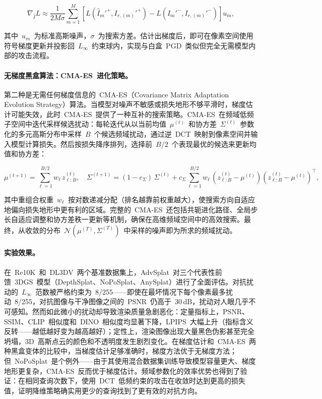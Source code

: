 \begin{equation}
    \nabla_{\hat{I}} L \approx \frac{1}{2M\sigma} \sum_{m=1}^{M} \left[L(\hat{I}_m'^{+}, I_{r,(m)}'^{+}) - L(\hat{I}_m'^{-}, I_{r,(m)}'^{-})\right] u_m,
\end{equation}

其中~$u_m$~为标准高斯噪声，$\sigma$~为搜索方差。估计出梯度后，即可在像素空间使用符号梯度更新并投影回~$L_\infty$~约束球内，实现与白盒~PGD~类似但完全无需模型内部的攻击流程。

\paragraph{无梯度黑盒算法：CMA-ES~进化策略。}
第二种是无需任何梯度信息的~CMA-ES（Covariance Matrix Adaptation Evolution Strategy）算法。当模型对噪声不敏感或损失地形不够平滑时，梯度估计可能失效，此时~CMA-ES~提供了一种互补的搜索策略。CMA-ES~在频域低频子空间中迭代采样候选扰动：每轮迭代从以当前均值~$\mu^{(t)}$~和协方差~$\Sigma^{(t)}$~参数化的多元高斯分布中采样~$B$~个候选频域扰动，通过逆~DCT~映射到像素空间并输入模型计算损失。然后按损失降序排列，选择前~$B/2$~个表现最优的候选来更新均值和协方差：

\begin{equation}
    \mu^{(t+1)} = \sum_{\ell=1}^{B/2} w_\ell \, z_{\ell:B}^{(t)}, \quad
    \Sigma^{(t+1)} = (1-c_\Sigma)\,\Sigma^{(t)} + c_\Sigma \sum_{\ell=1}^{B/2} w_\ell \, (z_{\ell:B}^{(t)} - \mu^{(t)})(z_{\ell:B}^{(t)} - \mu^{(t)})^\top,
\end{equation}

其中重组合权重~$w_\ell$~按对数递减分配（排名越靠前权重越大），使搜索方向自适应地偏向损失地形中更有利的区域。完整的~CMA-ES~还包括共轭进化路径、全局步长自适应调整和协方差秩一更新等机制，确保在高维频域空间中的高效搜索。最终，从收敛的分布~$\mathcal{N}(\mu^{(T)}, \Sigma^{(T)})$~中采样的噪声即为所求的频域扰动。

\paragraph{实验效果。}
在~Re10K~和~DL3DV~两个基准数据集上，AdvSplat~对三个代表性前馈~3DGS~模型（DepthSplat、NoPoSplat、AnySplat）进行了全面评估。对抗扰动的~$L_\infty$~范数被严格约束为~8/255——即使在最坏情况下每个像素最多扰动~8/255，对抗图像与干净图像之间的~PSNR~仍高于~30\,dB，扰动对人眼几乎不可感知。然而如此微小的扰动却导致渲染质量急剧恶化：定量指标上，PSNR、SSIM、CLIP~相似度和~DINO~相似度均显著下降，LPIPS~大幅上升（指标含义反转——越低越好变为越高越好）；定性上，渲染图像出现大量黑色伪影甚至完全坍塌，3D~高斯点云的颜色和不透明度发生剧烈变化。在梯度估计和~CMA-ES~两种黑盒变体的比较中，当梯度估计足够准确时，梯度方法优于无梯度方法；但~NoPoSplat~是个例外——由于其使用混合数据集训练导致模型容量更大、梯度地形更复杂，CMA-ES~反而优于梯度估计。频域参数化的效率优势也得到了验证：在相同查询次数下，使用~DCT~低频约束的攻击在收敛时达到更高的损失值，证明降维策略确实用更少的查询找到了更有效的对抗方向。

